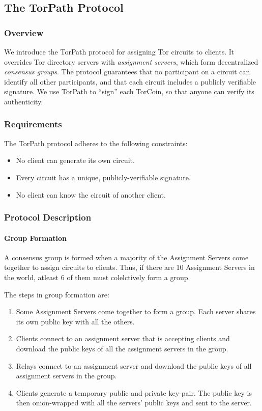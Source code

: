 \subsection{The TorPath Protocol}

\subsubsection{Overview}

We introduce the TorPath protocol for assigning Tor circuits to clients. It
overrides Tor directory servers with \textit{assignment servers}, which form
decentralized \textit{consensus groups}. The protocol guarantees that no
participant on a circuit can identify all other participants, and that each
circuit includes a publicly verifiable signature. We use TorPath to ``sign''
each TorCoin, so that anyone can verify its authenticity.

\subsubsection{Requirements}

The TorPath protocol adheres to the following constraints:

\begin{itemize}   
\item No client can generate its own circuit.   
\item Every
circuit has a unique, publicly-verifiable signature.   
\item No client can know the circuit of another client. \end{itemize}

\subsubsection{Protocol Description}

\paragraph{Group Formation}

A consensus group is formed when a majority of the Assignment Servers come
together to assign circuits to clients. Thus, if there are 10 Assignment Servers
in the world, atleast 6 of them must colelctively form a group.

The steps in group formation are: 
\begin{enumerate} 
\item Some Assignment Servers come together to form a group. Each server shares 
its own public key with all the others. 
\item Clients connect to an assignment server that is accepting clients and 
download the public keys of all the assignment servers in the group.
\item Relays connect to an assignment server and download the public
keys of all assignment servers in the group. 
\item Clients generate a temporary public and private key-pair. The public key 
is then onion-wrapped with all the servers' public keys and sent to the server.
\end{enumerate}

